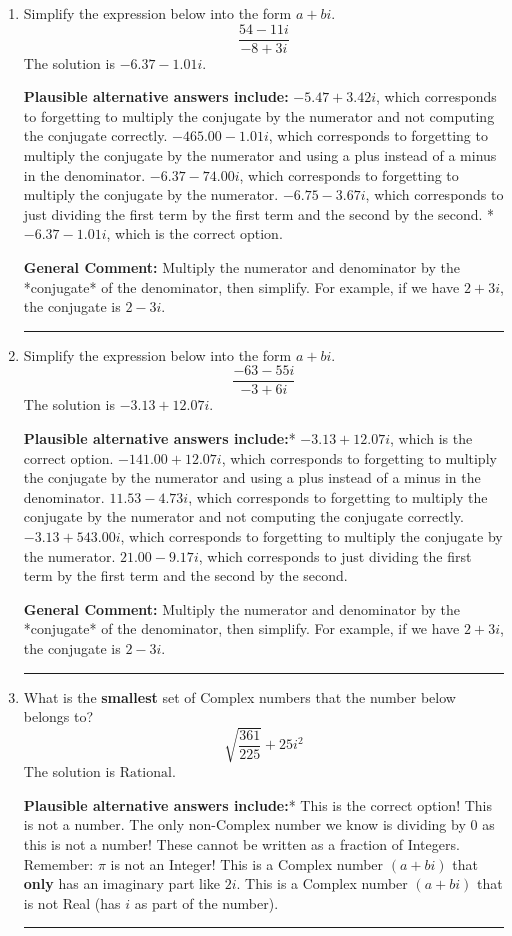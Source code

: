 \documentclass{extbook}[14pt]
\newcommand{\litem}[1]{\item #1

\rule{\textwidth}{0.4pt}}
\begin{document}
\begin{enumerate}\litem{
Simplify the expression below into the form $a+bi$.
\[ \frac{54 - 11 i}{-8 + 3 i} \]The solution is \( -6.37  - 1.01 i \).\begin{enumerate}[label=\Alph*.]
\textbf{Plausible alternative answers include:} $-5.47  + 3.42 i$, which corresponds to forgetting to multiply the conjugate by the numerator and not computing the conjugate correctly.
 $-465.00  - 1.01 i$, which corresponds to forgetting to multiply the conjugate by the numerator and using a plus instead of a minus in the denominator.
 $-6.37  - 74.00 i$, which corresponds to forgetting to multiply the conjugate by the numerator.
 $-6.75  - 3.67 i$, which corresponds to just dividing the first term by the first term and the second by the second.
* $-6.37  - 1.01 i$, which is the correct option.
\end{enumerate}

\textbf{General Comment:} Multiply the numerator and denominator by the *conjugate* of the denominator, then simplify. For example, if we have $2+3i$, the conjugate is $2-3i$.
}
\litem{
Simplify the expression below into the form $a+bi$.
\[ \frac{-63 - 55 i}{-3 + 6 i} \]The solution is \( -3.13  + 12.07 i \).\begin{enumerate}[label=\Alph*.]
\textbf{Plausible alternative answers include:}* $-3.13  + 12.07 i$, which is the correct option.
 $-141.00  + 12.07 i$, which corresponds to forgetting to multiply the conjugate by the numerator and using a plus instead of a minus in the denominator.
 $11.53  - 4.73 i$, which corresponds to forgetting to multiply the conjugate by the numerator and not computing the conjugate correctly.
 $-3.13  + 543.00 i$, which corresponds to forgetting to multiply the conjugate by the numerator.
 $21.00  - 9.17 i$, which corresponds to just dividing the first term by the first term and the second by the second.
\end{enumerate}

\textbf{General Comment:} Multiply the numerator and denominator by the *conjugate* of the denominator, then simplify. For example, if we have $2+3i$, the conjugate is $2-3i$.
}
\litem{
What is the \textbf{smallest} set of Complex numbers that the number below belongs to?
\[ \sqrt{\frac{361}{225}} + 25i^2 \]The solution is \( \text{Rational} \).\begin{enumerate}[label=\Alph*.]
\textbf{Plausible alternative answers include:}* This is the correct option!
This is not a number. The only non-Complex number we know is dividing by 0 as this is not a number!
These cannot be written as a fraction of Integers. Remember: $\pi$ is not an Integer!
This is a Complex number $(a+bi)$ that \textbf{only} has an imaginary part like $2i$.
This is a Complex number $(a+bi)$ that is not Real (has $i$ as part of the number).
\end{enumerate}

}
\end{enumerate}
\end{document}
